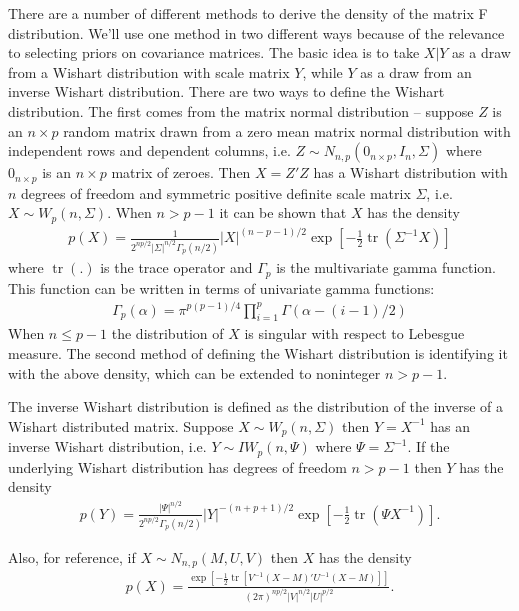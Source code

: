 \documentclass{article}\usepackage[]{graphicx}\usepackage[]{color}
\DeclareMathOperator{\tr}{tr}
\begin{document}
There are a number of different methods to derive the density of the matrix F distribution. We'll use one method in two different ways because of the relevance to selecting priors on covariance matrices. The basic idea is to take $X|Y$ as a draw from a Wishart distribution with scale matrix $Y$, while $Y$ as a draw from an inverse Wishart distribution. There are two ways to define the Wishart distribution. The first comes from the matrix normal distribution -- suppose $Z$ is an $n\times p$ random matrix drawn from a zero mean matrix normal distribution with independent rows and dependent columns, i.e. $Z\sim N_{n,p}(0_{n\times p},I_n,\Sigma)$ where $0_{n\times p}$ is an $n\times p$ matrix of zeroes. Then $X=Z'Z$ has a Wishart distribution with $n$ degrees of freedom and symmetric positive definite scale matrix $\Sigma$, i.e. $X \sim W_p(n,\Sigma)$. When $n>p-1$ it can be shown that $X$ has the density
\begin{align*}
  p(X) = \frac{1}{2^{np/2}|\Sigma|^{n/2}\Gamma_p(n/2)}|X|^{(n-p-1)/2}\exp\left[-\frac{1}{2}\tr(\Sigma^{-1}X)\right]
\end{align*}
where $\tr(.)$ is the trace operator and $\Gamma_p$ is the multivariate gamma function. This function can be written in terms of univariate gamma functions:
\begin{align*}
  \Gamma_p(\alpha) = \pi^{p(p-1)/4}\prod_{i=1}^p\Gamma(\alpha - (i-1)/2)  
\end{align*}
When $n\leq p-1$ the distribution of $X$ is singular with respect to Lebesgue measure. The second method of defining the Wishart distribution is identifying it with the above density, which can be extended to noninteger $n>p-1$. 

The inverse Wishart distribution is defined as the distribution of the inverse of a Wishart distributed matrix. Suppose $X\sim W_p(n,\Sigma)$ then $Y=X^{-1}$ has an inverse Wishart distribution, i.e. $Y\sim IW_p(n,\Psi)$ where $\Psi = \Sigma^{-1}$. If the underlying Wishart distribution has degrees of freedom $n>p-1$ then $Y$ has the density
\begin{align*}
  p(Y) = \frac{|\Psi|^{n/2}}{2^{np/2}\Gamma_p(n/2)}|Y|^{-(n + p + 1)/2}\exp\left[-\frac{1}{2}\tr(\Psi X^{-1})\right].
\end{align*}

Also, for reference, if $X\sim N_{n,p}(M,U,V)$ then $X$ has the density
\begin{align*}
  p(X) = \frac{\exp\left[-\frac{1}{2}\tr[V^{-1}(X-M)'U^{-1}(X-M)]\right]}{(2\pi)^{np/2}|V|^{n/2}|U|^{p/2}}.
\end{align*}
\end{document}
